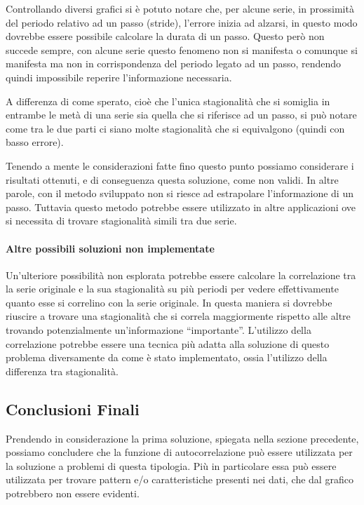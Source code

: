Controllando diversi grafici si è potuto notare che, per alcune serie, in prossimità del periodo 
relativo ad un passo (stride), l'errore inizia ad alzarsi, in questo modo dovrebbe essere possibile 
calcolare la durata di un passo.
Questo però non succede sempre, con alcune serie questo fenomeno non si manifesta o comunque
si manifesta ma non in corrispondenza del periodo legato ad un passo, rendendo quindi impossibile
reperire l'informazione necessaria.

A differenza di come sperato, cioè che l'unica stagionalità che si somiglia in entrambe le metà
di una serie sia quella che si riferisce ad un passo, si può notare come tra le due parti ci siano
molte stagionalità che si equivalgono (quindi con basso errore).

Tenendo a mente le considerazioni fatte fino questo punto possiamo considerare i risultati ottenuti,
e di conseguenza questa soluzione, come non validi.
In altre parole, con il metodo sviluppato non si riesce ad estrapolare l'informazione di un passo. 
Tuttavia questo metodo potrebbe essere utilizzato in altre applicazioni ove si necessita di trovare
stagionalità simili tra due serie.


\paragraph*{Altre possibili soluzioni non implementate}
Un'ulteriore possibilità non esplorata potrebbe essere calcolare la correlazione tra la 
serie originale e la sua stagionalità su più periodi per vedere effettivamente quanto esse 
si correlino con la serie originale. In questa maniera si dovrebbe riuscire a trovare una stagionalità
che si correla maggiormente rispetto alle altre trovando potenzialmente un'informazione ``importante''.
L'utilizzo della correlazione potrebbe essere una tecnica più adatta alla soluzione di questo problema
diversamente da come è stato implementato, ossia l'utilizzo della differenza tra stagionalità.


\subsection{Conclusioni Finali}
Prendendo in considerazione la prima soluzione, spiegata nella sezione precedente, possiamo concludere
che la funzione di autocorrelazione può essere utilizzata per la soluzione a problemi di questa tipologia.
Più in particolare essa può essere utilizzata per trovare pattern e/o caratteristiche presenti nei dati, 
che dal grafico potrebbero non essere evidenti.

